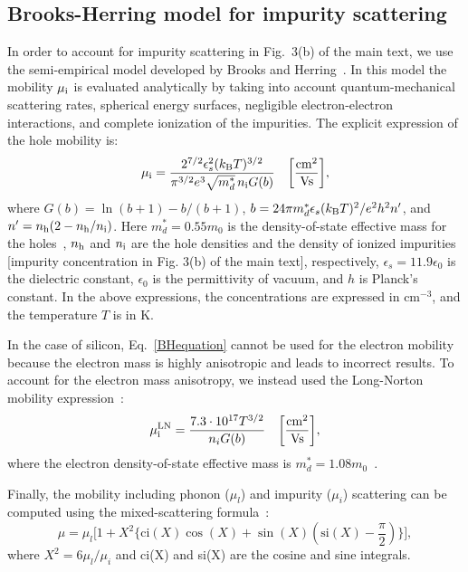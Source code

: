 \documentclass[aps,prl,twocolumn,superscriptaddress]{revtex4-1}
\begin{document}
\subsection{Brooks-Herring model for impurity scattering}

In order to account for impurity scattering in Fig.~3(b) of the main text, we use the
semi-empirical model developed by Brooks and Herring~\cite{Brooks1951,Li1977}.
In this model the mobility $\mu_{\rm i}$ is evaluated analytically by taking into
account quantum-mechanical scattering rates, spherical energy surfaces, negligible 
electron-electron interactions, and complete ionization of the impurities. 
The explicit expression of the hole mobility is:
  \begin{equation}\label{BHequation}
  \mu_{\rm i} = \frac{2^{7/2} \epsilon_s^2 (k_{\rm B}T)^{3/2} }{\pi^{3/2} e^3 \sqrt{m_d^*} \,n_{\rm i} 
  G(b)} \quad \bigg[\frac{\rm{cm^2}}{\rm{Vs}}\bigg],
  \end{equation}
where $G(b) = \ln(b+1) - b/(b+1)$, $b = 24\pi m_d^* \epsilon_s (k_{\rm B}T)^{2}/e^2 h^2 n'$, and
$n'=n_{\rm h}(2-n_{\rm h}/n_{\rm i})$.
Here $m_d^*=0.55 m_0$ is the density-of-state effective mass for the holes~\cite{Balkanski2000}, $n_{\rm h}$ and $n_{\rm i}$ are the hole densities and 
the density of ionized impurities [impurity concentration in Fig. 3(b) of the main text], 
respectively, $\epsilon_s=11.9\epsilon_0$ is the dielectric constant, $\epsilon_0$ is the
permittivity of vacuum, and $h$ is Planck's constant. In the above expressions, 
the concentrations are expressed in cm$^{-3}$, and the temperature $T$ is in K.

In the case of silicon, Eq.~\eqref{BHequation} cannot be used for the electron mobility 
because the electron mass is highly anisotropic and leads to incorrect results. To account for the electron mass 
anisotropy, we instead used the Long-Norton mobility expression~\cite{Norton1973,Li1977}:
  \begin{equation}
  \mu_{\rm i}^{\rm{LN}} = \frac{7.3\cdot 10^{17} T^{3/2} }{n_i G(b)} \quad \bigg[\frac{\rm{cm^2}}{\rm{Vs}}\bigg],
  \end{equation}
where the electron density-of-state effective mass is $m_d^*=1.08 m_0$~\cite{Sze2007}.

 Finally, the mobility including phonon ($\mu_l$) and impurity ($\mu_i$) scattering can be computed using the 
 mixed-scattering formula~\cite{Li1977}:
  \begin{equation}
  \mu =\mu_l \Big[ 1 + X^2\{ \text{ci}(X)\cos(X) + \sin(X)(\text{si}(X)-\frac{\pi}{2})\}  \Big], 
  \end{equation}
where $X^2 = 6\mu_l/\mu_i$ and ci(X) and si(X) are the cosine and sine integrals. 
\end{document}
